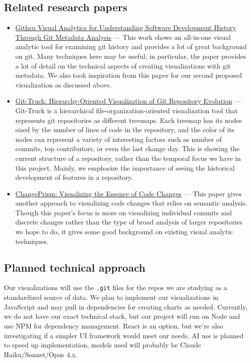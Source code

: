 \documentclass[12 pt]{article}
\begin{document}
\subsection{Related research papers}
\begin{itemize}
\item
    \href{https://ieeexplore.ieee.org/stamp/stamp.jsp?tp=&arnumber=9222261}{Githru\:
        Visual Analytics for Understanding Software Development History Through
        Git Metadata Analysis} ---
    This work shows an all-in-one visual analytic tool for examining git history
        and provides a lot of great background on git. Many techniques here may
        be useful; in particular, the paper provides a lot of detail on the
        technical aspects of creating visualizations with git metadata. We
        also took inspiration from this paper for our second proposed
        visualization as discussed above.
\item \href{https://mircealungu.com/docs/assets/papers/22-Git-Truck.pdf}{Git-Truck: Hierarchy-Oriented Visualization of
Git Repository Evolution} --- Git-Truck is a hierarchical file-organization-oriented
    visualization tool that represents git repositories as different treemaps.
    Each treemap has its nodes sized by the number of lines of code in the repository, 
    and the color of its nodes can represent a variety of interesting factors
    such as number of commits, top contributors, or even the last change day.
    This is showing the current structure of a repository, rather than the temporal 
    focus we have in this project. Mainly, we emphasize the importance of seeing
    the historical development of features in a repository.
\item \href{https://arxiv.org/pdf/2508.12649}{ChangePrism: Visualizing the
    Essence of Code Changes} --- This paper gives another approach to visualizing
        code changes that relies on semantic analysis. Though this paper's focus
        is more on visualizing individual commits and discrete changes rather
        than the type of broad analysis of larger repositories we hope to do,
        it gives some good background on existing visual analytic techniques.
\end{itemize}
\subsection{Planned technical approach}
Our visualizations will use the \texttt{.git} files for the repos we are studying as a
standardized source of data. We plan to implement our visualizations in
JavaScript and may pull in dependencies for creating charts as needed.
Currently, we do not have our exact technical stack, but our project will run on
Node and use NPM for dependency management.
React is an option, but we're also investigating if a simpler UI framework would
meet our needs. AI use is planned to speed up implementation, models used will
probably be Claude Haiku/Sonnet/Opus 4.x.
\end{document}
